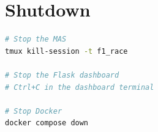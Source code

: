 \section{Shutdown}

\begin{lstlisting}[language=bash, numbers=none]
# Stop the MAS
tmux kill-session -t f1_race

# Stop the Flask dashboard
# Ctrl+C in the dashboard terminal

# Stop Docker
docker compose down
\end{lstlisting}
